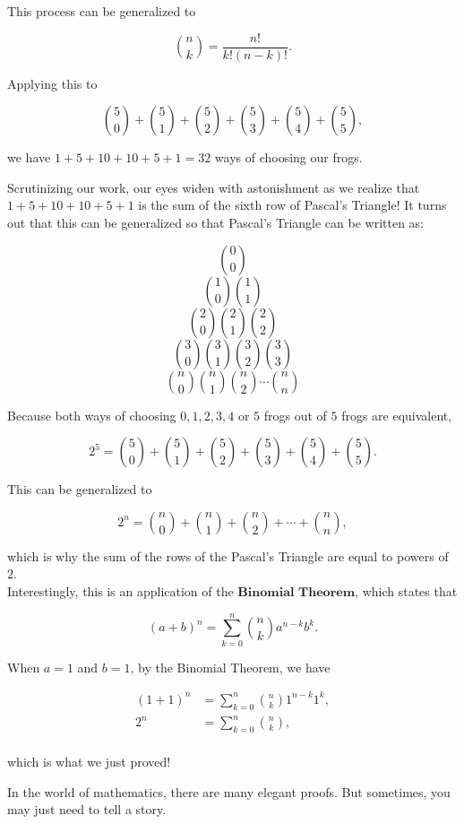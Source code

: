 \documentclass{article}
\begin{document}
This process can be generalized to 

$${n \choose k} = \dfrac{n!}{k!(n-k)!}.$$

Applying this to 

$${5 \choose 0}+{5 \choose 1}+{5 \choose 2}+{5 \choose 3}+{5 \choose 4}+{5 \choose 5},$$ 

we have $1 + 5 + 10 + 10 + 5 + 1 = 32$ ways of choosing our frogs.

Scrutinizing our work, our eyes widen with astonishment as we realize that $1 + 5 + 10 + 10 + 5 + 1$ is the sum of the sixth row of Pascal's Triangle! It turns out that this can be generalized so that Pascal's Triangle can be written as:

$$0 \choose 0$$
$${1 \choose 0} {1 \choose 1}$$
$${2 \choose 0} {2 \choose 1} {2 \choose 2}$$
$${3 \choose 0} {3 \choose 1} {3 \choose 2} {3 \choose 3}$$
$${n \choose 0} {n \choose 1} {n \choose 2} \cdots {n \choose n}$$

Because both ways of choosing $0, 1, 2, 3, 4$ or $5$ frogs out of $5$ frogs are equivalent, 

$$2^5 = {5 \choose 0} + {5 \choose 1} + {5 \choose 2} + {5 \choose 3} + {5 \choose 4} + {5 \choose 5}.$$

This can be generalized to 

$$2^n = {n \choose 0}+{n \choose 1}+{n \choose 2}+ \cdots +{n \choose n},$$

which is why the sum of the rows of the Pascal's Triangle are equal to powers of $2$. \\

Interestingly, this is an application of the $\textbf{Binomial Theorem}$, which states that 

$$(a+b)^n = \sum_{k=0}^n {n \choose k} a^{n-k}b^k.$$

When $a = 1$ and $b=1$, by the Binomial Theorem, we have 

\begin{align*}
(1+1)^n &= \sum_{k=0}^n {n \choose k} 1^{n-k}1^k,\\
2^n &= \sum_{k=0}^n {n \choose k},\\
\end{align*}

which is what we just proved!

In the world of mathematics, there are many elegant proofs. But sometimes, you may just need to tell a story.
\end{document}
